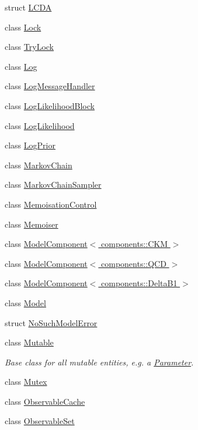 \begin{DoxyCompactItemize}
\item 
struct \hyperlink{structeos_1_1LCDA}{LCDA}
\item 
class \hyperlink{classeos_1_1Lock}{Lock}
\item 
class \hyperlink{classeos_1_1TryLock}{TryLock}
\item 
class \hyperlink{classeos_1_1Log}{Log}
\item 
class \hyperlink{classeos_1_1LogMessageHandler}{LogMessageHandler}
\item 
class \hyperlink{classeos_1_1LogLikelihoodBlock}{LogLikelihoodBlock}
\item 
class \hyperlink{classeos_1_1LogLikelihood}{LogLikelihood}
\item 
class \hyperlink{classeos_1_1LogPrior}{LogPrior}
\item 
class \hyperlink{classeos_1_1MarkovChain}{MarkovChain}
\item 
class \hyperlink{classeos_1_1MarkovChainSampler}{MarkovChainSampler}
\item 
class \hyperlink{classeos_1_1MemoisationControl}{MemoisationControl}
\item 
class \hyperlink{classeos_1_1Memoiser}{Memoiser}
\item 
class \hyperlink{classeos_1_1ModelComponent_3_01components_1_1CKM_01_4}{ModelComponent$<$ components::CKM $>$}
\item 
class \hyperlink{classeos_1_1ModelComponent_3_01components_1_1QCD_01_4}{ModelComponent$<$ components::QCD $>$}
\item 
class \hyperlink{classeos_1_1ModelComponent_3_01components_1_1DeltaB1_01_4}{ModelComponent$<$ components::DeltaB1 $>$}
\item 
class \hyperlink{classeos_1_1Model}{Model}
\item 
struct \hyperlink{structeos_1_1NoSuchModelError}{NoSuchModelError}
\item 
class \hyperlink{classeos_1_1Mutable}{Mutable}
\begin{DoxyCompactList}\small\item\em Base class for all mutable entities, e.g. a \hyperlink{classeos_1_1Parameter}{Parameter}. \item\end{DoxyCompactList}\item 
class \hyperlink{classeos_1_1Mutex}{Mutex}
\item 
class \hyperlink{classeos_1_1ObservableCache}{ObservableCache}
\item 
class \hyperlink{classeos_1_1ObservableSet}{ObservableSet}

\end{DoxyCompactItemize}
